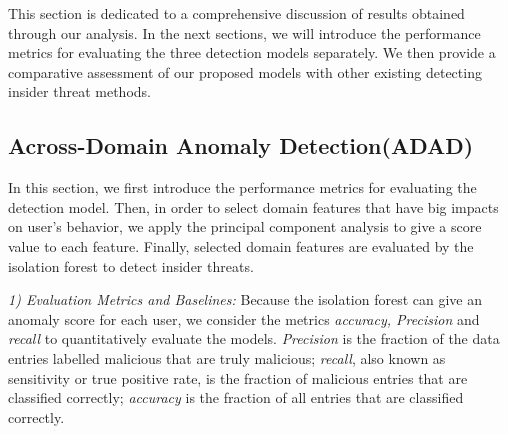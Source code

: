 \documentclass[conference]{IEEEtran}
\begin{document}
This section is dedicated to a comprehensive discussion of results obtained through our analysis.
In the next sections, we will introduce the performance metrics for evaluating the three detection models separately. 
We then provide a comparative assessment of our proposed models with other existing detecting insider threat methods. 


\subsection{Across-Domain Anomaly Detection(ADAD)}\label{AA}
In this section, we first introduce the performance metrics for evaluating the detection model. 
Then, in order to select domain features that have big impacts on user's behavior, we apply the principal component analysis to give a score value to each feature. 
Finally, selected domain features are evaluated by the isolation forest to detect insider threats.


\emph{1) Evaluation Metrics and Baselines:}
Because the isolation forest can give an anomaly score for each user, we consider the metrics \emph{accuracy, Precision} and \emph{recall} to quantitatively evaluate the models.  
\emph{Precision} is the
fraction of the data entries labelled malicious that are
truly malicious; \emph{recall}, also known as sensitivity or true
positive rate, is the fraction of malicious entries that are
classified correctly; \emph{accuracy} is the fraction of all entries
that are classified correctly\cite{b56}.

\end{document}
